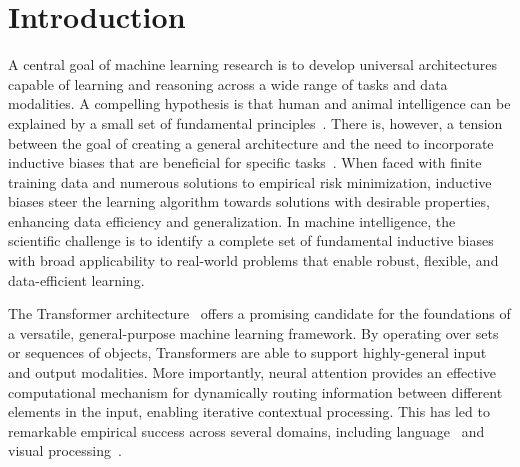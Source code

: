 \section{Introduction}\label{sec:intro}

A central goal of machine learning research is to develop universal architectures capable of learning and reasoning across a wide range of tasks and data modalities. A compelling hypothesis is that human and animal intelligence can be explained by a small set of fundamental principles~\citep{marcus2003algebraic}. There is, however, a tension between the goal of creating a general architecture and the need to incorporate inductive biases that are beneficial for specific tasks~\citep{wolpert1995no,baxter2000model}. When faced with finite training data and numerous solutions to empirical risk minimization, inductive biases steer the learning algorithm towards solutions with desirable properties, enhancing data efficiency and generalization.
In machine intelligence, the scientific challenge is to identify a complete set of fundamental inductive biases with broad applicability to real-world problems that enable robust, flexible, and data-efficient learning.

The Transformer architecture~\citep{vaswani2017attention} offers a promising candidate for the foundations of a versatile, general-purpose machine learning framework. By operating over sets or sequences of objects, Transformers are able to support highly-general input and output modalities. More importantly, neural attention provides an effective computational mechanism for dynamically routing information between different elements in the input, enabling iterative contextual processing. This has led to remarkable empirical success across several domains, including language~\citep{radfordImprovingLanguageUnderstanding2018,devlinBERTPretrainingDeep2019,radford2019language,kaplan2020scalinglawsneurallanguage,brown2020languagemodelsfewshotlearners} and visual processing~\citep{dosovitskiyImageWorth16x162020,carion2020end,zhai2022scaling}.


